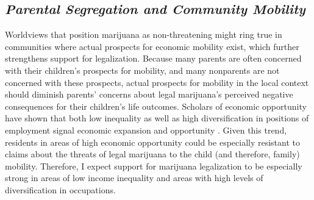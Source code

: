 \subsection{\it{Parental Segregation and Community Mobility}}


Worldviews that position marijuana as non-threatening might ring true in communities where actual prospects for economic mobility exist, which further strengthens support for legalization. Because many parents are often concerned with their children's prospects for mobility, and many nonparents are not concerned with these prospects, actual prospects for mobility in the local context should diminish parents' concerns about legal marijuana's perceived negative consequences for their children's life outcomes. Scholars of economic opportunity have shown that both low inequality as well as high diversification in positions of employment signal economic expansion and opportunity \citep{blau_and_duncan_1967,moore_1966}. Given this trend, residents in areas of high economic opportunity could be especially resistant to claims about the threats of legal marijuana to the child (and therefore, family) mobility. Therefore, I expect support for marijuana legalization to be especially strong in areas of low income inequality and areas with high levels of diversification in occupations. 




